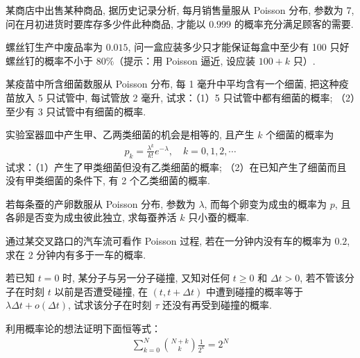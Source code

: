 \documentclass[../../main.tex]{subfiles}
\begin{document}
\begin{exercise}\label{exercise:ch02-39}
某商店中出售某种商品, 据历史记录分析, 每月销售量服从 Poisson 分布, 参数为 7, 问在月初进货时要库存多少件此种商品, 才能以 $0.999$ 的概率充分满足顾客的需要.
\end{exercise}

\begin{exercise}\label{exercise:ch02-40}
螺丝钉生产中废品率为 $0.015$, 问一盒应装多少只才能保证每盒中至少有 100 只好螺丝钉的概率不小于 $80\%$（提示：用 Poisson 逼近, 设应装 $100+k$ 只）.
\end{exercise}

\begin{exercise}\label{exercise:ch02-41}
某疫苗中所含细菌数服从 Poisson 分布, 每 1 毫升中平均含有一个细菌, 把这种疫苗放入 5 只试管中, 每试管放 2 毫升, 试求：（1）5 只试管中都有细菌的概率; （2）至少有 3 只试管中有细菌的概率.
\end{exercise}

\begin{exercise}\label{exercise:ch02-42}
实验室器皿中产生甲、乙两类细菌的机会是相等的, 且产生 $k$ 个细菌的概率为
\begin{align*}
p_k=\frac{\lambda^k}{k!}e^{-\lambda},\quad k=0,1,2,\cdots
\end{align*}
试求：（1）产生了甲类细菌但没有乙类细菌的概率; （2）在已知产生了细菌而且没有甲类细菌的条件下, 有 2 个乙类细菌的概率.
\end{exercise}

\begin{exercise}\label{exercise:ch02-43}
若每条蚕的产卵数服从 Poisson 分布, 参数为 $\lambda$, 而每个卵变为成虫的概率为 $p$, 且各卵是否变为成虫彼此独立, 求每蚕养活 $k$ 只小蚕的概率.
\end{exercise}

\begin{exercise}\label{exercise:ch02-44}
通过某交叉路口的汽车流可看作 Poisson 过程, 若在一分钟内没有车的概率为 $0.2$, 求在 2 分钟内有多于一车的概率.
\end{exercise}

\begin{exercise}\label{exercise:ch02-45}
若已知 $t=0$ 时, 某分子与另一分子碰撞, 又知对任何 $t\geqslant 0$ 和 $\Delta t>0$, 若不管该分子在时刻 $t$ 以前是否遭受碰撞, 在 $(t,t+\Delta t)$ 中遭到碰撞的概率等于 $\lambda\Delta t+o(\Delta t)$, 试求该分子在时刻 $\tau$ 还没有再受到碰撞的概率.
\end{exercise}

\begin{exercise}\label{exercise:ch02-46}
利用概率论的想法证明下面恒等式：
\begin{align*}
\sum_{k=0}^{N}\binom{N+k}{k}\frac{1}{2^k}=2^N
\end{align*}
\end{exercise}
\end{document}
